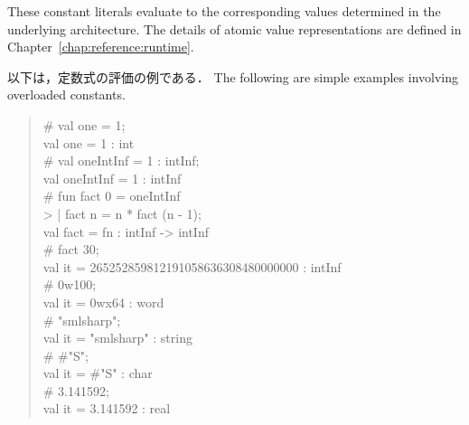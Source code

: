 \documentclass{jbook}
\newenvironment{program}{\begin{quote}\begin{tt}}%
                        {\end{tt}\end{quote}}
\begin{document}
	These constant literals evaluate to the corresponding values
determined in the underlying architecture. 
	The details of atomic value representations are defined in
Chapter~\ref{chap:reference:runtime}.
\fi%

\ifjp%
	以下は，定数式の評価の例である．
\else%
	The following are simple examples involving overloaded constants.
\fi%
\begin{program}
\# val one = 1;\\
val one = 1 : int\\
\# val oneIntInf = 1 : intInf;\\
val oneIntInf = 1 : intInf\\
\# fun fact 0 = oneIntInf\\
>   | fact n = n * fact (n - 1);\\
val fact = fn : intInf -> intInf\\
\# fact 30;\\
val it = 265252859812191058636308480000000 : intInf\\
\# 0w100;\\
val it = 0wx64 : word\\
\# "smlsharp";\\
val it = "smlsharp" : string\\
\# \#"S";\\
val it = \#"S" : char\\
\# 3.141592;\\
val it = 3.141592 : real\\
\end{program}
\end{document}
